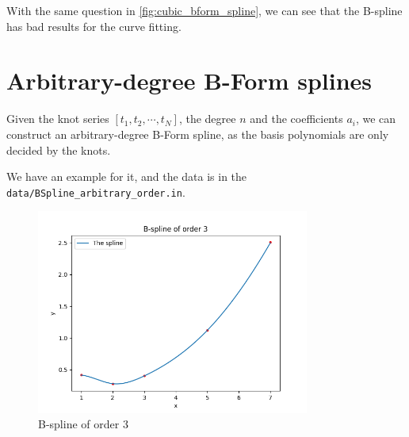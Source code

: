 \documentclass[a4paper]{article}
\begin{document}
With the same question in \cref{fig:cubic_bform_spline}, we can see that the B-spline has bad results for the curve fitting.

\section{Arbitrary-degree B-Form splines}

Given the knot series $[t_1, t_2, \cdots, t_N]$, the degree $n$ and the coefficients $a_i$, we can construct an arbitrary-degree B-Form spline, as the basis polynomials are only decided by the knots.

We have an example for it, and the data is in the \verb|data/BSpline_arbitrary_order.in|.

\begin{figure}[htbp]
  \centering
  \includegraphics[width = 0.8\textwidth]{../figure/B-spline of order 3.png}
  \caption{B-spline of order 3}
\end{figure}
\end{document}
